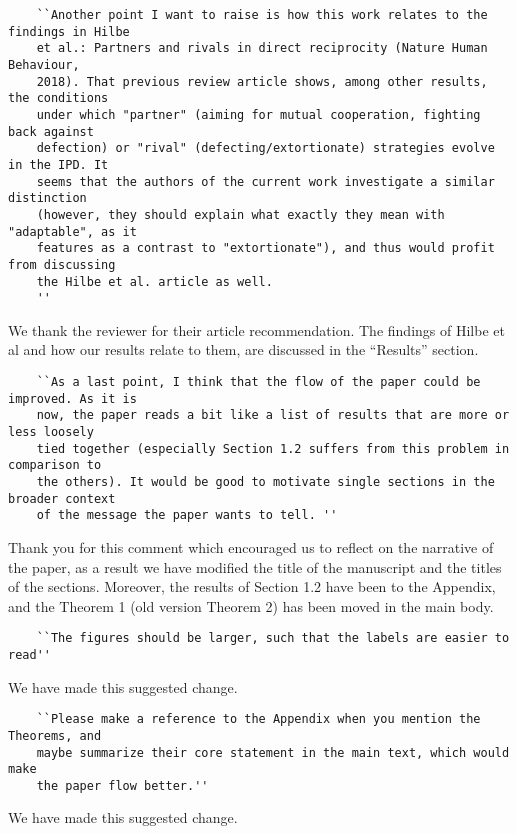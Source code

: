 \documentclass{article}
\begin{document}
\begin{verbatim}
    ``Another point I want to raise is how this work relates to the findings in Hilbe
    et al.: Partners and rivals in direct reciprocity (Nature Human Behaviour,
    2018). That previous review article shows, among other results, the conditions
    under which "partner" (aiming for mutual cooperation, fighting back against
    defection) or "rival" (defecting/extortionate) strategies evolve in the IPD. It
    seems that the authors of the current work investigate a similar distinction
    (however, they should explain what exactly they mean with "adaptable", as it
    features as a contrast to "extortionate"), and thus would profit from discussing
    the Hilbe et al. article as well.
    ''
\end{verbatim}

We thank the reviewer for their article recommendation. The findings of Hilbe et
 al and how our results relate to them, are discussed in the ``Results'' section. %

\begin{verbatim}
    ``As a last point, I think that the flow of the paper could be improved. As it is
    now, the paper reads a bit like a list of results that are more or less loosely
    tied together (especially Section 1.2 suffers from this problem in comparison to
    the others). It would be good to motivate single sections in the broader context
    of the message the paper wants to tell. ''
\end{verbatim}

Thank you for this comment which encouraged us to reflect on the narrative of the
paper, as a result we have modified the title of the manuscript and the titles
of the sections. Moreover, the results of Section 1.2 have been to the Appendix,
and the Theorem 1 (old version Theorem 2) has been moved in the main body.

\begin{verbatim}
    ``The figures should be larger, such that the labels are easier to read''
\end{verbatim}

We have made this suggested change.

\begin{verbatim}
    ``Please make a reference to the Appendix when you mention the Theorems, and
    maybe summarize their core statement in the main text, which would make
    the paper flow better.''
\end{verbatim}

We have made this suggested change.
\end{document}
